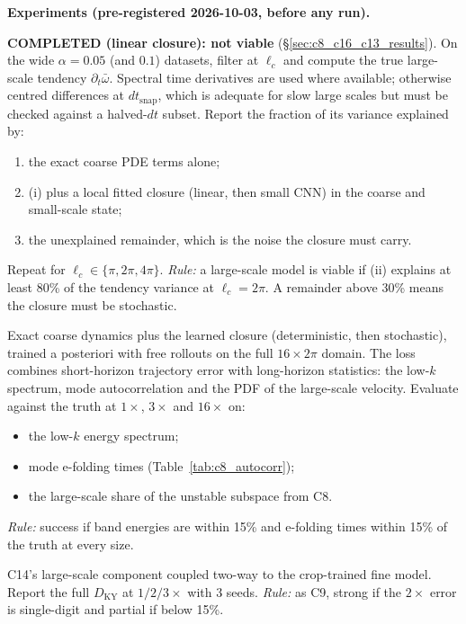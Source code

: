 \documentclass[11pt]{article}
\begin{document}
\textbf{Experiments (pre-registered 2026-10-03, before any run).}
\begin{description}[leftmargin=*]
\item[C13 --- closure diagnostic (no training, cheap).] \textbf{COMPLETED (linear closure): not viable} (\S\ref{sec:c8_c16_c13_results}). On the wide
  $\alpha{=}0.05$ (and $0.1$) datasets, filter at $\ell_c$ and compute the
  true large-scale tendency $\partial_t\bar\omega$. Spectral time
  derivatives are used where available; otherwise centred differences at
  $dt_{\mathrm{snap}}$, which is adequate for slow large scales but must
  be checked against a halved-$dt$ subset. Report the fraction of its
  variance explained by:
  \begin{enumerate}[label=(\roman*),leftmargin=*]
  \item the exact coarse PDE terms alone;
  \item (i) plus a local fitted closure (linear, then small CNN) in the
    coarse and small-scale state;
  \item the unexplained remainder, which is the noise the closure must
    carry.
  \end{enumerate}
  Repeat for $\ell_c\in\{\pi, 2\pi, 4\pi\}$.
  \emph{Rule:} a large-scale model is viable if (ii) explains at least
  80\% of the tendency variance at $\ell_c{=}2\pi$. A remainder above
  30\% means the closure must be stochastic.
\item[C14 --- large-scale-only model.] Exact coarse dynamics plus the
  learned closure (deterministic, then stochastic), trained a posteriori
  with free rollouts on the full $16\times2\pi$ domain. The loss
  combines short-horizon trajectory error with long-horizon statistics:
  the low-$k$ spectrum, mode autocorrelation and the PDF of the
  large-scale velocity. Evaluate against the truth at $1\times$,
  $3\times$ and $16\times$ on:
  \begin{itemize}[leftmargin=*]
  \item the low-$k$ energy spectrum;
  \item mode e-folding times (Table~\ref{tab:c8_autocorr});
  \item the large-scale share of the unstable subspace from C8.
  \end{itemize}
  \emph{Rule:} success if band energies are within 15\% and e-folding
  times within 15\% of the truth at every size.
\item[C15 --- coupled two-scale model.] C14's large-scale component
  coupled two-way to the crop-trained fine model. Report the full
  $D_{\mathrm{KY}}$ at $1/2/3\times$ with 3 seeds.
  \emph{Rule:} as C9, strong if the $2\times$ error is single-digit and
  partial if below 15\%.
\end{description}
\end{document}
